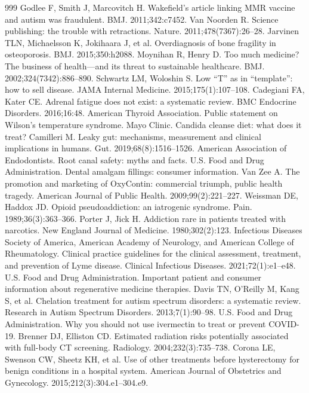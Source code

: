 \documentclass[11pt,oneside]{book}
\begin{document}
\begin{thebibliography}{999}
Godlee F, Smith J, Marcovitch H. Wakefield's article linking MMR vaccine and autism was fraudulent. BMJ. 2011;342:c7452.
Van Noorden R. Science publishing: the trouble with retractions. Nature. 2011;478(7367):26--28.
Jarvinen TLN, Michaelsson K, Jokihaara J, et al. Overdiagnosis of bone fragility in osteoporosis. BMJ. 2015;350:h2088.
Moynihan R, Henry D. Too much medicine? The business of health---and its threat to sustainable healthcare. BMJ. 2002;324(7342):886--890.
Schwartz LM, Woloshin S. Low ``T'' as in ``template'': how to sell disease. JAMA Internal Medicine. 2015;175(1):107--108.
Cadegiani FA, Kater CE. Adrenal fatigue does not exist: a systematic review. BMC Endocrine Disorders. 2016;16:48.
American Thyroid Association. Public statement on Wilson's temperature syndrome.
Mayo Clinic. Candida cleanse diet: what does it treat?
Camilleri M. Leaky gut: mechanisms, measurement and clinical implications in humans. Gut. 2019;68(8):1516--1526.
American Association of Endodontists. Root canal safety: myths and facts.
U.S. Food and Drug Administration. Dental amalgam fillings: consumer information.
Van Zee A. The promotion and marketing of OxyContin: commercial triumph, public health tragedy. American Journal of Public Health. 2009;99(2):221--227.
Weissman DE, Haddox JD. Opioid pseudoaddiction: an iatrogenic syndrome. Pain. 1989;36(3):363--366.
Porter J, Jick H. Addiction rare in patients treated with narcotics. New England Journal of Medicine. 1980;302(2):123.
Infectious Diseases Society of America, American Academy of Neurology, and American College of Rheumatology. Clinical practice guidelines for the clinical assessment, treatment, and prevention of Lyme disease. Clinical Infectious Diseases. 2021;72(1):e1--e48.
U.S. Food and Drug Administration. Important patient and consumer information about regenerative medicine therapies.
Davis TN, O'Reilly M, Kang S, et al. Chelation treatment for autism spectrum disorders: a systematic review. Research in Autism Spectrum Disorders. 2013;7(1):90--98.
U.S. Food and Drug Administration. Why you should not use ivermectin to treat or prevent COVID-19.
Brenner DJ, Elliston CD. Estimated radiation risks potentially associated with full-body CT screening. Radiology. 2004;232(3):735--738.
Corona LE, Swenson CW, Sheetz KH, et al. Use of other treatments before hysterectomy for benign conditions in a hospital system. American Journal of Obstetrics and Gynecology. 2015;212(3):304.e1--304.e9.

\end{thebibliography}
\end{document}
